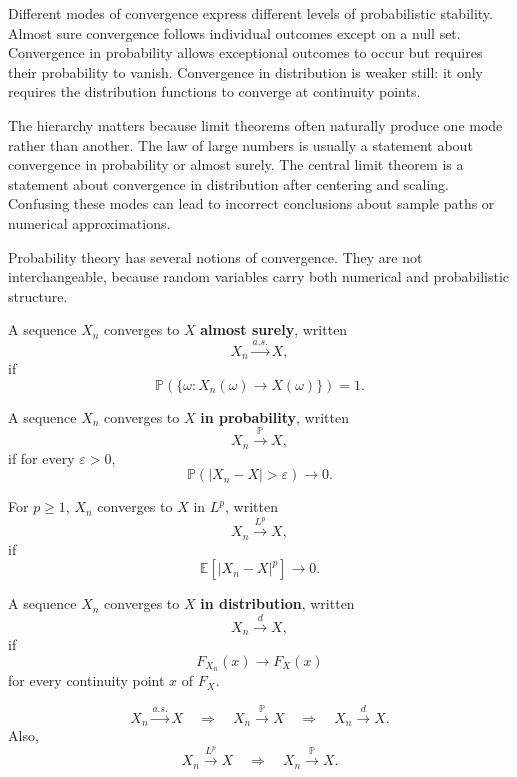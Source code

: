 Different modes of convergence express different levels of probabilistic stability. Almost sure convergence follows individual outcomes except on a null set. Convergence in probability allows exceptional outcomes to occur but requires their probability to vanish. Convergence in distribution is weaker still: it only requires the distribution functions to converge at continuity points.

The hierarchy matters because limit theorems often naturally produce one mode rather than another. The law of large numbers is usually a statement about convergence in probability or almost surely. The central limit theorem is a statement about convergence in distribution after centering and scaling. Confusing these modes can lead to incorrect conclusions about sample paths or numerical approximations.

Probability theory has several notions of convergence. They are not interchangeable, because random variables carry both numerical and probabilistic structure.

\begin{definition}
A sequence $X_n$ converges to $X$ \textbf{almost surely}, written
\[
    X_n\xrightarrow{a.s.}X,
\]
if
\[
    \mathbb{P}\left(\{\omega:X_n(\omega)\to X(\omega)\}\right)=1.
\]
\end{definition}

\begin{definition}
A sequence $X_n$ converges to $X$ \textbf{in probability}, written
\[
    X_n\xrightarrow{\mathbb{P}}X,
\]
if for every $\varepsilon>0$,
\[
    \mathbb{P}(|X_n-X|>\varepsilon)\to 0.
\]
\end{definition}

\begin{definition}[$L^p$ Convergence]
For $p\geq 1$, $X_n$ converges to $X$ in $L^p$, written
\[
    X_n\xrightarrow{L^p}X,
\]
if
\[
    \mathbb{E}[|X_n-X|^p]\to 0.
\]
\end{definition}

\begin{definition}
A sequence $X_n$ converges to $X$ \textbf{in distribution}, written
\[
    X_n\xrightarrow{d}X,
\]
if
\[
    F_{X_n}(x)\to F_X(x)
\]
for every continuity point $x$ of $F_X$.
\end{definition}


\begin{theorem}
\[
    X_n\xrightarrow{a.s.}X\quad\Longrightarrow\quad X_n\xrightarrow{\mathbb{P}}X\quad\Longrightarrow\quad X_n\xrightarrow{d}X.
\]
Also,
\[
    X_n\xrightarrow{L^p}X\quad\Longrightarrow\quad X_n\xrightarrow{\mathbb{P}}X.
\]
\end{theorem}

